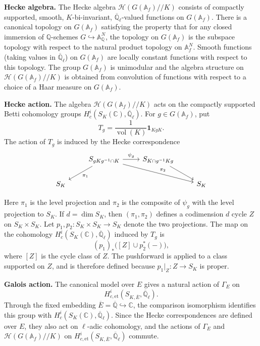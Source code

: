 \documentclass[11pt,a4paper]{article}
\theoremstyle{definition}
\theoremstyle{plain}
\theoremstyle{remark}
\theoremstyle{plain}
\DeclareMathOperator{\vol}{vol}
\begin{document}
\textbf{Hecke algebra.}
The Hecke algebra $\mathcal{H}(G(\mathbb{A}_f)//K)$ consists of compactly supported, smooth, $K$-bi-invariant, $\overline{\mathbb{Q}}_\ell$-valued functions on $G(\mathbb{A}_f)$. There is a canonical topology on $G(\mathbb{A}_f)$ satisfying the property that for any closed immersion of $\mathbb{Q}$-schemes $G \hookrightarrow \mathbb{A}_{\mathbb{Q}}^N$, the topology on $G(\mathbb{A}_f)$ is the subspace topology with respect to the natural product topology on $\mathbb{A}_f^N$. Smooth functions (taking values in $\overline{\mathbb{Q}}_\ell$) on $G(\mathbb{A}_f)$ are locally constant functions with respect to this topology. The group $G(\mathbb{A}_f)$ is unimodular and the algebra structure on $\mathcal{H}(G(\mathbb{A}_f)//K)$ is obtained from convolution of functions with respect to a choice of a Haar measure on $G(\mathbb{A}_f)$.

\textbf{Hecke action.}
The algebra $\mathcal{H}(G(\mathbb{A}_f)//K)$ acts on the compactly supported Betti cohomology groups $H_c^i(S_K(\mathbb{C}),\overline{\mathbb{Q}}_\ell)$. For $g\in G(\mathbb{A}_f)$, put
$$
    T_g=\frac{1}{\vol(K)}\mathbf{1}_{KgK}.
$$
The action of $T_g$ is induced by the Hecke correspondence
$$
\begin{tikzcd}
& S_{gKg^{-1} \cap K} \arrow{dl}{\pi_1} \arrow{r}{\psi_g} \arrow{drr}{\pi_2} & S_{K \cap g^{-1}Kg} \arrow{dr} & \\
S_K &  & & S_K
\end{tikzcd}
$$

Here $\pi_1$ is the level projection and $\pi_2$ is the composite of $\psi_g$ with the level projection to $S_K$. If $d = \dim S_K$, then $(\pi_1, \pi_2)$ defines a codimension $d$ cycle $Z$ on $S_K \times S_K$. Let $p_1,p_2:S_K\times S_K\to S_K$ denote the two projections. The map on the cohomology $H_c^i(S_K(\mathbb{C}), \overline{\mathbb{Q}}_\ell)$ induced by $T_g$ is
$$
    (p_1)_*\bigl([Z]\cup p_2^*(-)\bigr),
$$
where $[Z]$ is the cycle class of $Z$. The pushforward is applied to a class supported on $Z$, and is therefore defined because $p_1|_Z:Z\to S_K$ is proper.

\textbf{Galois action.}
The canonical model over $E$ gives a natural action of $\Gamma_E$ on
$$
    H^i_{c,\mathrm{et}}(S_{K,\overline{E}},\overline{\mathbb{Q}}_\ell).
$$
Through the fixed embedding $\overline{E}=\overline{\mathbb{Q}}\hookrightarrow\mathbb{C}$, the comparison isomorphism identifies this group with $H_c^i(S_K(\mathbb{C}),\overline{\mathbb{Q}}_\ell)$. Since the Hecke correspondences are defined over $E$, they also act on $\ell$-adic cohomology, and the actions of $\Gamma_E$ and $\mathcal{H}(G(\mathbb{A}_f)//K)$ on $H^i_{c,\mathrm{et}}(S_{K,\overline{E}},\overline{\mathbb{Q}}_\ell)$ commute.
\end{document}
